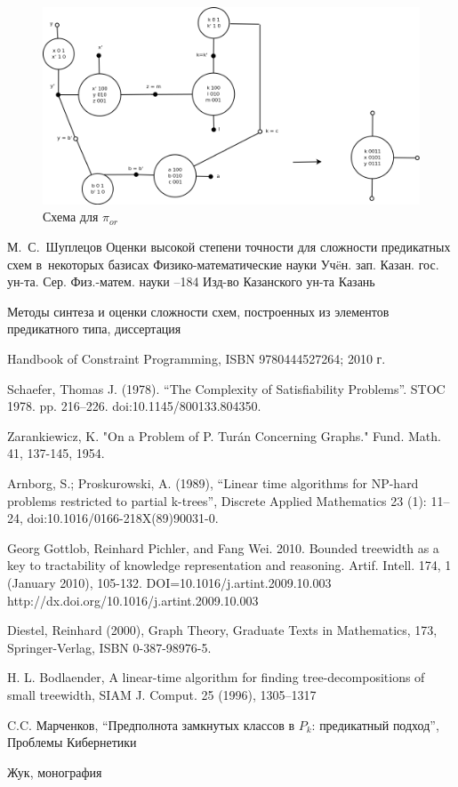 \documentclass[12pt]{article}
\begin{document}
\begin{figure}[htb]
\centering
\includegraphics[width=1.0\textwidth]{min_or.png}
\caption{Схема для $\pi_{or}$}
\label{fig:or}
\end{figure}
\clearpage
{}
    \by М.~С.~Шуплецов
    \paper Оценки высокой степени точности для сложности предикатных схем в~некоторых базисах
    \inbook Физико-математические науки
    \serial Уч\"eн. зап. Казан. гос. ун-та. Сер. Физ.-матем. науки
    --184
    \publ Изд-во Казанского ун-та
    \publaddr Казань

Методы синтеза и оценки сложности схем, построенных из элементов предикатного типа, диссертация

 Handbook of Constraint Programming, ISBN 9780444527264; 2010 г.

 Schaefer, Thomas J. (1978). 
``The Complexity of Satisfiability Problems''. STOC 1978. pp. 216–226. doi:10.1145/800133.804350.

 Zarankiewicz, K. "On a Problem of P. Turán Concerning Graphs." Fund. Math. 41, 137-145, 1954. 

 Arnborg, S.; Proskurowski, A. (1989), 
``Linear time algorithms for NP-hard problems restricted to partial k-trees'',
Discrete Applied Mathematics 23 (1): 11–24, doi:10.1016/0166-218X(89)90031-0.

Georg Gottlob, Reinhard Pichler, and Fang Wei. 2010. Bounded treewidth as a key to tractability of knowledge representation and reasoning. Artif. Intell. 174, 1 (January 2010), 105-132. DOI=10.1016/j.artint.2009.10.003 http://dx.doi.org/10.1016/j.artint.2009.10.003

Diestel, Reinhard (2000), Graph Theory, Graduate Texts in Mathematics, 
173, Springer-Verlag, ISBN 0-387-98976-5.

H. L. Bodlaender, A linear-time algorithm for finding 
tree-decompositions of small
treewidth, SIAM J. Comput. 25 (1996), 1305–1317

C.C. Марченков, ``Предполнота замкнутых классов в $P_k$: предикатный подход'', Проблемы Кибернетики

Жук, монография

\endthebibliography
\end{document}
